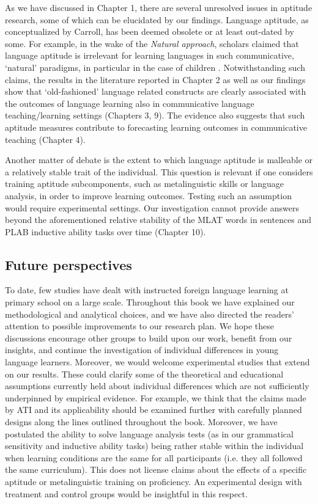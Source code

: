 \documentclass[output=paper]{langsci/langscibook}
\begin{document}
As we have discussed in Chapter 1, there are several unresolved issues in aptitude research, some of which can be elucidated by our findings. Language aptitude, as conceptualized by Carroll, has been deemed obsolete or at least out-dated by some. For example, in the wake of the \textit{Natural approach}, scholars claimed that language aptitude is irrelevant for learning languages in such communicative, ‘natural’ paradigms, in particular in the case of children \citep[72]{Skehan2002}. Notwithstanding such claims, the results in the literature reported in Chapter 2 as well as our findings show that ‘old-fashioned’ language related constructs are clearly associated with the outcomes of language learning also in communicative language teaching/learning settings (Chapters 3, 9). The evidence also suggests that such aptitude measures contribute to forecasting learning outcomes in communicative teaching (Chapter 4). 

Another matter of debate is the extent to which language aptitude is malleable or a relatively stable trait of the individual. This question is relevant if one considers training aptitude subcomponents, such as metalinguistic skills or language analysis, in order to improve learning outcomes. Testing such an assumption would require experimental settings. Our investigation cannot provide answers beyond the aforementioned relative stability of the MLAT words in sentences and PLAB inductive ability tasks over time (Chapter 10). 

\subsection{Future perspectives}

To date, few studies have dealt with instructed foreign language learning at primary school on a large scale. Throughout this book we have explained our methodological and analytical choices, and we have also directed the readers' attention to possible improvements to our research plan. We hope these discussions encourage other groups to build upon our work, benefit from our insights, and continue the investigation of individual differences in young language learners. Moreover, we would welcome experimental studies that extend on our results. These could clarify some of the theoretical and educational assumptions currently held about individual differences which are not sufficiently underpinned by empirical evidence. For example, we think that the claims made by ATI and its applicability should be examined further with carefully planned designs along the lines outlined throughout the book. Moreover, we have postulated the ability to solve language analysis tests (as in our grammatical sensitivity and inductive ability tasks) being rather stable within the individual when learning conditions are the same for all participants (i.e. they all followed the same curriculum). This does not license claims about the effects of a specific aptitude or metalinguistic training on proficiency. An experimental design with treatment and control groups would be insightful in this respect. 
\end{document}
